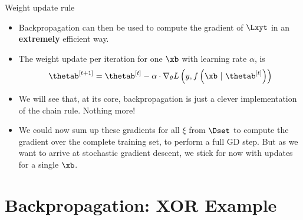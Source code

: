 \begin{vbframe}{Weight update rule}
  \begin{itemize}
    \item Backpropagation can then be used to compute the gradient of $\Lxyt$ in an \textbf{extremely} efficient way.
    \item The weight update per iteration for one $\xb$ with learning rate $\alpha$, is 
      $$\thetab^{[t+1]} = \thetab^{[t]} - \alpha \cdot \nabla_{\theta}L\left(y, f\left(\xb ~|~ \thetab^{[t]}\right)\right)$$ 
        \item We will see that, at its core, backpropagation is just a clever implementation of the chain rule. Nothing more!
  \item We could now sum up these gradients for all $\xi$ from $\Dset$ to compute the gradient over the complete training set, to perform a full GD step. But as we want to arrive at stochastic gradient descent, 
    we stick for now with updates for a single $\xb$.
  \end{itemize}
\end{vbframe}

\section{Backpropagation: XOR Example}


